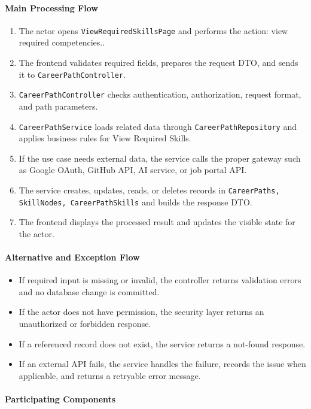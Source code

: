 \paragraph{Main Processing Flow}

\begin{enumerate}
    \item The actor opens \texttt{ViewRequiredSkillsPage} and performs the action: view required competencies..
    \item The frontend validates required fields, prepares the request DTO, and sends it to \texttt{CareerPathController}.
    \item \texttt{CareerPathController} checks authentication, authorization, request format, and path parameters.
    \item \texttt{CareerPathService} loads related data through \texttt{CareerPathRepository} and applies business rules for View Required Skills.
    \item If the use case needs external data, the service calls the proper gateway such as Google OAuth, GitHub API, AI service, or job portal API.
    \item The service creates, updates, reads, or deletes records in \texttt{CareerPaths, SkillNodes, CareerPathSkills} and builds the response DTO.
    \item The frontend displays the processed result and updates the visible state for the actor.
\end{enumerate}

\paragraph{Alternative and Exception Flow}

\begin{itemize}
    \item If required input is missing or invalid, the controller returns validation errors and no database change is committed.
    \item If the actor does not have permission, the security layer returns an unauthorized or forbidden response.
    \item If a referenced record does not exist, the service returns a not-found response.
    \item If an external API fails, the service handles the failure, records the issue when applicable, and returns a retryable error message.
\end{itemize}

\paragraph{Participating Components}

